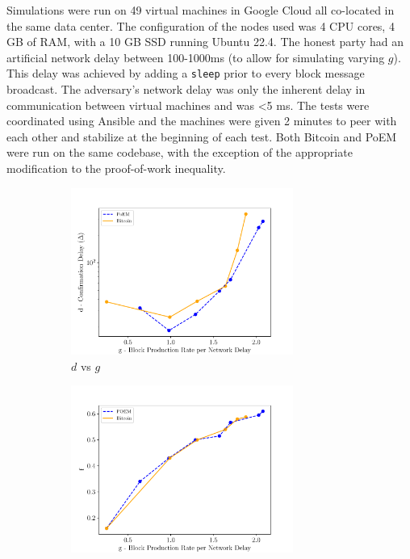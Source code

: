 Simulations were run on 49 virtual machines in Google Cloud all co-located in
the same data center. The configuration of the nodes used was 4 CPU cores, 4
GB of RAM, with a 10 GB SSD running Ubuntu 22.4. The honest party
had an artificial network delay between 100-1000ms (to allow for simulating varying
$g$). This delay was achieved by adding a \texttt{sleep} prior to every block message
broadcast. The adversary's network delay was only the inherent delay in communication
between virtual machines and was <5 ms. The tests were coordinated using Ansible and the
machines were given 2 minutes to peer with each other and stabilize at the beginning of
each test.
Both Bitcoin and PoEM were run on the same codebase,
with the exception of the appropriate modification to the proof-of-work inequality.

\iftwocolumn
\begin{figure}[h]
    \centering
    \begin{subfigure}{0.49\textwidth}
    \centering
    \includegraphics[width = 0.8\textwidth]{figures/dvsg.pdf}
    \caption{$d$ vs $g$}
    \label{fig:dvsg}
    \end{subfigure}
    \begin{subfigure}{0.49\textwidth}
    \centering
    \includegraphics[width = 0.8\textwidth]{figures/fvg.pdf}

\end{subfigure}
\end{figure}
